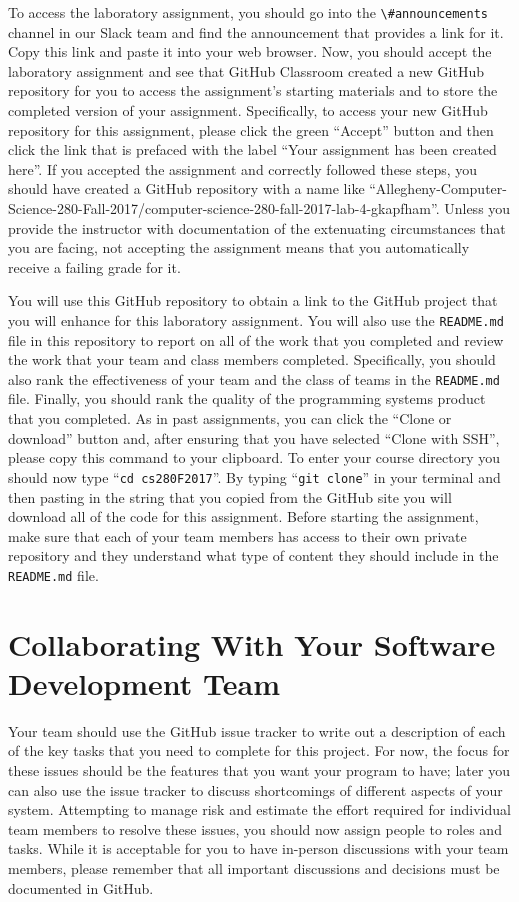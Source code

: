 \documentclass[11pt]{article}
\newcommand{\reflection}{\lstinline{README.md}}
\newcommand{\command}[1]{``\lstinline{#1}''}
\newcommand{\channel}[1]{\lstinline{#1}}
\begin{document}
To access the laboratory assignment, you should go into the \channel{\#announcements} channel in our Slack team and find
the announcement that provides a link for it. Copy this link and paste it into your web browser. Now, you should accept
the laboratory assignment and see that GitHub Classroom created a new GitHub repository for you to access the
assignment's starting materials and to store the completed version of your assignment. Specifically, to access your new
GitHub repository for this assignment, please click the green ``Accept'' button and then click the link that is prefaced
with the label ``Your assignment has been created here''. If you accepted the assignment and correctly followed these
steps, you should have created a GitHub repository with a name like
``Allegheny-Computer-Science-280-Fall-2017/computer-science-280-fall-2017-lab-4-gkapfham''. Unless you provide the
instructor with documentation of the extenuating circumstances that you are facing, not accepting the assignment means
that you automatically receive a failing grade for it.

You will use this GitHub repository to obtain a link to the GitHub project that you will enhance for this laboratory
assignment. You will also use the \reflection{} file in this repository to report on all of the work that you completed
and review the work that your team and class members completed. Specifically, you should also rank the effectiveness of
your team and the class of teams in the \reflection{} file. Finally, you should rank the quality of the programming
systems product that you completed. As in past assignments, you can click the ``Clone or download'' button and, after
ensuring that you have selected ``Clone with SSH'', please copy this command to your clipboard. To enter your course
directory you should now type \command{cd cs280F2017}. By typing \command{git clone} in your terminal and then pasting
in the string that you copied from the GitHub site you will download all of the code for this assignment. Before
starting the assignment, make sure that each of your team members has access to their own private repository and they
understand what type of content they should include in the \reflection{} file.

\section*{Collaborating With Your Software Development Team}

Your team should use the GitHub issue tracker to write out a description of each of the key tasks that you need to
complete for this project. For now, the focus for these issues should be the features that you want your program to
have; later you can also use the issue tracker to discuss shortcomings of different aspects of your system. Attempting
to manage risk and estimate the effort required for individual team members to resolve these issues, you should now
assign people to roles and tasks. While it is acceptable for you to have in-person discussions with your team members,
please remember that all important discussions and decisions must be documented in GitHub.
\end{document}
